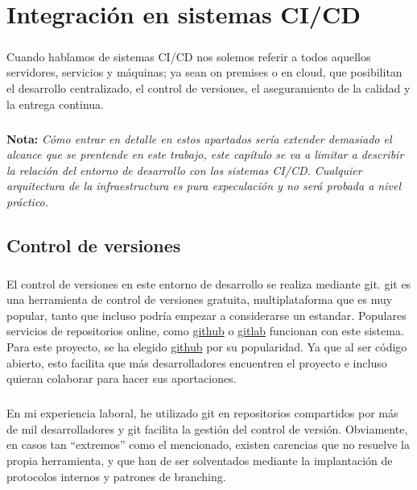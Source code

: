 \chapter{Integración en sistemas CI/CD}\label{sec:cicd}

\paragraph{}Cuando hablamos de sistemas \gls{CI/CD} nos solemos referir a todos aquellos
servidores, servicios y máquinas; ya sean \gls{on premises} o en cloud, que posibilitan
el desarrollo centralizado, el control de versiones, el aseguramiento de la calidad
y la entrega continua.

\paragraph{}\textbf{Nota: }\emph{Cómo entrar en detalle en estos apartados sería extender
demasiado el alcance que se prentende en este trabajo, este capítulo se va a limitar a
describir la relación del entorno de desarrollo con los sistemas \gls{CI/CD}. Cualquier
arquitectura de la infraestructura es pura expeculación y no será probada a nivel práctico.}

\section{Control de versiones}

\paragraph{}El control de versiones en este entorno de desarrollo se realiza mediante
\gls{git}. \Gls{git} es una herramienta de control de versiones gratuita, multiplataforma que
es muy popular, tanto que incluso podría empezar a considerarse un estandar. Populares
servicios de repositorios online, como \href{github.com}{github} o \href{gitlab.com}{gitlab}
funcionan con este sistema. Para este proyecto, se ha elegido \href{github.com}{github}
por su popularidad. Ya que al ser código abierto, esto facilita que más desarrolladores
encuentren el proyecto e incluso quieran colaborar para hacer sus aportaciones.

\paragraph{}En mi experiencia laboral, he utilizado \gls{git} en repositorios compartidos
por más de mil desarrolladores y \gls{git} facilita la gestión del control de versión.
Obviamente, en casos tan ``extremos'' como el mencionado, existen carencias que no
resuelve la propia herramienta, y que han de ser solventados mediante la implantación
de protocolos internos y patrones de branching.

